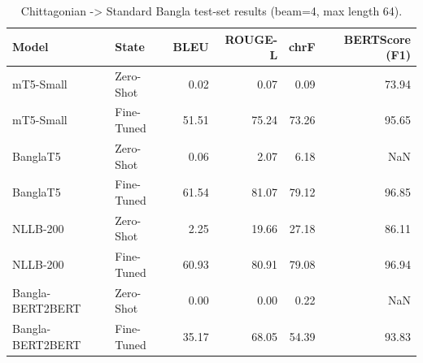 \begin{table}
\caption{Chittagonian -> Standard Bangla test-set results (beam=4, max length 64).}
\label{tab:results}
\begin{tabular}{llrrrr}
\toprule
Model & State & BLEU & ROUGE-L & chrF & BERTScore (F1) \\
\midrule
mT5-Small & Zero-Shot & 0.02 & 0.07 & 0.09 & 73.94 \\
mT5-Small & Fine-Tuned & 51.51 & 75.24 & 73.26 & 95.65 \\
BanglaT5 & Zero-Shot & 0.06 & 2.07 & 6.18 & NaN \\
BanglaT5 & Fine-Tuned & 61.54 & 81.07 & 79.12 & 96.85 \\
NLLB-200 & Zero-Shot & 2.25 & 19.66 & 27.18 & 86.11 \\
NLLB-200 & Fine-Tuned & 60.93 & 80.91 & 79.08 & 96.94 \\
Bangla-BERT2BERT & Zero-Shot & 0.00 & 0.00 & 0.22 & NaN \\
Bangla-BERT2BERT & Fine-Tuned & 35.17 & 68.05 & 54.39 & 93.83 \\
\bottomrule
\end{tabular}
\end{table}
